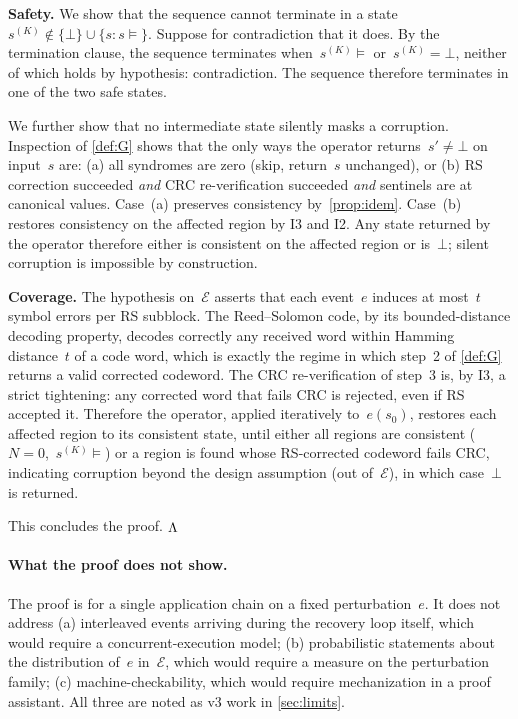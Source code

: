 \textbf{Safety.}
We show that the sequence cannot terminate in a state~\(s^{(K)}
\notin \{\bot\} \cup \{s : s \models\}\). Suppose for contradiction
that it does. By the termination clause, the sequence terminates
when~\(s^{(K)} \models\) or~\(s^{(K)} = \bot\), neither of which
holds by hypothesis: contradiction. The sequence therefore terminates
in one of the two safe states.

We further show that no intermediate state silently masks a
corruption. Inspection of \cref{def:G} shows that the only ways
the operator returns~\(s' \neq \bot\) on input~\(s\) are: (a) all
syndromes are zero (skip, return~\(s\) unchanged), or (b) RS
correction succeeded \emph{and} CRC re-verification succeeded
\emph{and} sentinels are at canonical values. Case~(a) preserves
consistency by~\cref{prop:idem}. Case~(b) restores
consistency on the affected region by I3 and I2. Any state
returned by the operator therefore either is consistent on the
affected region or is~\(\bot\); silent corruption is impossible
by construction.

\textbf{Coverage.}
The hypothesis on~\(\mathcal{E}\) asserts that each event~\(e\)
induces at most~\(t\) symbol errors per RS subblock. The
Reed--Solomon code, by its bounded-distance decoding property,
decodes correctly any received word within Hamming distance~\(t\)
of a code word, which is exactly the regime in which step~2 of
\cref{def:G} returns a valid corrected codeword. The CRC
re-verification of step~3 is, by I3, a strict tightening: any
corrected word that fails CRC is rejected, even if RS accepted it.
Therefore the operator, applied iteratively to~\(e(s_0)\), restores
each affected region to its consistent state, until either all
regions are consistent (\(N = 0\),~\(s^{(K)} \models\)) or a region
is found whose RS-corrected codeword fails CRC, indicating
corruption beyond the design assumption (out of~\(\mathcal{E}\)),
in which case~\(\bot\) is returned.

This concludes the proof. \(\mathchar"1003\)

\paragraph{What the proof does not show.}
The proof is for a single application chain on a fixed
perturbation~\(e\). It does not address (a) interleaved events
arriving during the recovery loop itself, which would require a
concurrent-execution model; (b) probabilistic statements about the
distribution of~\(e\) in~\(\mathcal{E}\), which would require a
measure on the perturbation family; (c) machine-checkability,
which would require mechanization in a proof assistant. All three
are noted as v3 work in \cref{sec:limits}.
